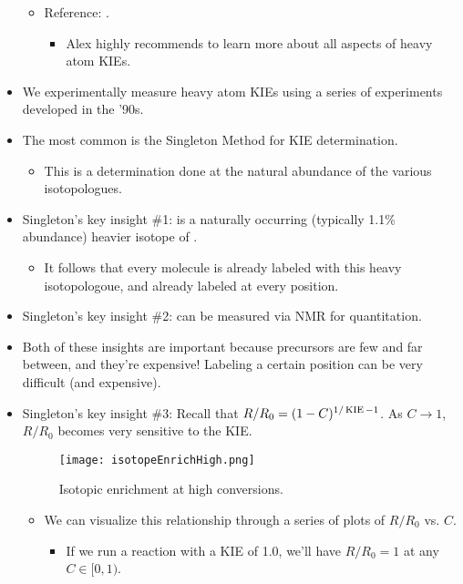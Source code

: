 \documentclass[../notes.tex]{subfiles}
\begin{document}
\begin{itemize}
\begin{itemize}
        \item Reference: \textcite{bib:HeavyAtomKIE}.
        \begin{itemize}
            \item Alex highly recommends to learn more about all aspects of heavy atom KIEs.
        \end{itemize}
    \end{itemize}
    \pagebreak
    \item We experimentally measure heavy atom KIEs using a series of experiments developed in the '90s.
    \item The most common is the Singleton Method for KIE determination.
    \begin{itemize}
        \item This is a determination done at the natural abundance of the various isotopologues.
    \end{itemize}
    \item Singleton's key insight \#1:  is a naturally occurring (typically 1.1\% abundance) heavier isotope of .
    \begin{itemize}
        \item It follows that every molecule is already labeled with this heavy isotopologoue, and already labeled at every position.
    \end{itemize}
    \item Singleton's key insight \#2:  can be measured via  NMR for quantitation.
    \item Both of these insights are important because  precursors are few and far between, and they're expensive! Labeling a certain position can be very difficult (and expensive).
    \item Singleton's key insight \#3: Recall that $R/R_0=(1-C)^{1/\operatorname{KIE}-1}$. As $C\to 1$, $R/R_0$ becomes very sensitive to the KIE.
    \begin{figure}[h!]
        \centering
        \texttt{[image: isotopeEnrichHigh.png]}
        \caption{Isotopic enrichment at high conversions.}
        \label{fig:isotopeEnrichHigh}
    \end{figure}
    \begin{itemize}
        \item We can visualize this relationship through a series of plots of $R/R_0$ vs. $C$.
        \begin{itemize}
            \item If we run a reaction with a KIE of 1.0, we'll have $R/R_0=1$ at any $C\in[0,1)$.

\end{itemize}
\end{itemize}
\end{itemize}
\end{document}
